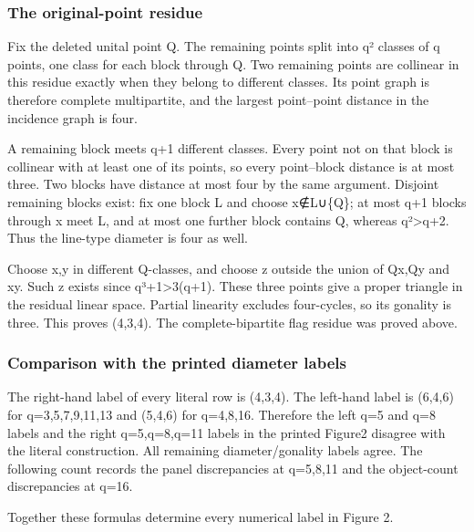 \subsubsection{The original-point
residue}\label{the-original-point-residue}

Fix the deleted unital point Q. The remaining points split into q²
classes of q points, one class for each block through Q. Two remaining
points are collinear in this residue exactly when they belong to
different classes. Its point graph is therefore complete multipartite,
and the largest point--point distance in the incidence graph is four.

A remaining block meets q+1 different classes. Every point not on that
block is collinear with at least one of its points, so every
point--block distance is at most three. Two blocks have distance at most
four by the same argument. Disjoint remaining blocks exist: fix one
block L and choose x∉L∪\{Q\}; at most q+1 blocks through x meet L, and
at most one further block contains Q, whereas q²\textgreater q+2. Thus
the line-type diameter is four as well.

Choose x,y in different Q-classes, and choose z outside the union of
Qx,Qy and xy. Such z exists since q³+1\textgreater3(q+1). These three
points give a proper triangle in the residual linear space. Partial
linearity excludes four-cycles, so its gonality is three. This proves
(4,3,4). The complete-bipartite flag residue was proved above.

\subsubsection{Comparison with the printed diameter
labels}\label{comparison-with-the-printed-diameter-labels}

The right-hand label of every literal row is (4,3,4). The left-hand
label is (6,4,6) for q=3,5,7,9,11,13 and (5,4,6) for q=4,8,16. Therefore
the left q=5 and q=8 labels and the right q=5,q=8,q=11 labels in the
printed Figure2 disagree with the literal construction. All remaining
diameter/gonality labels agree. The following count records the panel
discrepancies at q=5,8,11 and the object-count discrepancies at q=16.

Together these formulas determine every numerical label in Figure 2.
